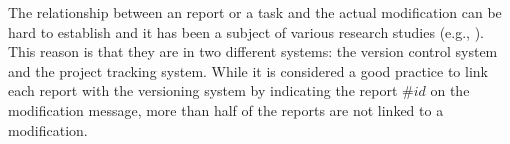 The relationship between an report or a task and the actual modification can be hard to establish and it has been a subject of various research studies (e.g., \cite{Antoniol2002,Bachmann2010,Wu2011}).
This reason is that they are in two different systems: the version control system and the project tracking system.
While it is considered a good practice to link each report with the versioning system by indicating the report $\#id$ on the modification message, more than half of the reports are not linked to a modification\cite{Wu2011}.
